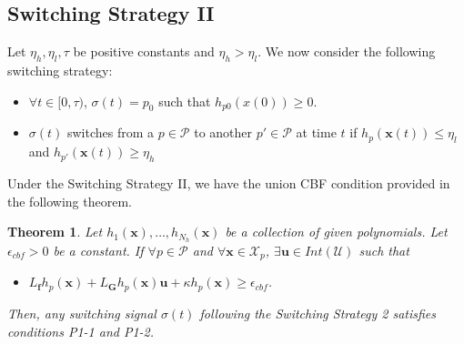 \documentclass[letterpaper, 10 pt, conference]{ieeeconf}  %
\newtheorem{theorem}{Theorem}
\begin{document}
\subsection{Switching Strategy II}
\label{sec:switching_policy_ii}
Let $\eta_h, \eta_l, \tau$ be positive constants and $\eta_h > \eta_l$. We now consider the following switching strategy:
{
\begin{itemize}
    \item $\forall t\in[0, \tau)$, $\sigma(t) = p_0$ such that $h_{p0}(x(0))\geq 0$.
    \item $\sigma(t)$ switches from a $p\in\mathcal{P}$ to another $p'\in\mathcal{P}$ at time $t$ if $h_p(\mathbf{x}(t))\leq \eta_l$ and $h_{p'}(\mathbf{x}(t))\geq \eta_h$
\end{itemize}
}
Under the Switching Strategy II, we have the union CBF condition provided in the following theorem.
\begin{theorem}
\label{thm:union-CBF-switching 2}
    Let $h_1(\mathbf{x}),\dots,h_{N_h}(\mathbf{x})$ be a collection of given polynomials. {Let $\epsilon_{cbf}>0$ be a constant.} If $\forall p\in\mathcal{P}$ and $\forall \mathbf{x}\in\mathcal{X}_p$, $\exists \mathbf{u}\in Int(\mathcal{U})$ such that
    \begin{itemize}
        \item [\textbf{C2-1}] $L_\mathbf{f}h_p(\mathbf{x}) + L_{\mathbf{G}}h_p(\mathbf{x})\mathbf{u}+\kappa h_p(\mathbf{x}) \geq \epsilon_{cbf}$.
    \end{itemize}
    Then, any switching signal $\sigma(t)$ following the Switching Strategy 2 satisfies conditions P1-1 and P1-2.
\end{theorem}
\end{document}
